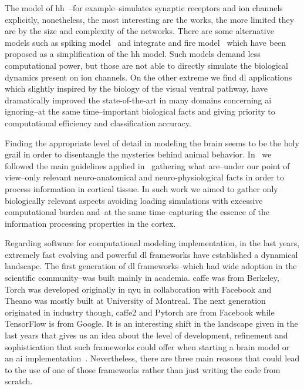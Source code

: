 \documentclass[10pt,journal,compsoc]{IEEEtran}
\begin{document}
The model of \gls{hh}~\cite{HODGKIN199025}--for example--simulates synaptic receptors and ion channels explicitly, nonetheless, the most interesting are the works, the more limited they are by the size and complexity of the networks. There are some alternative models such as spiking model~\cite{Izhikevich2004SpiketimingDO} and integrate and fire model~\cite{1333071} which have been proposed as a simplification of the \gls{hh} model. Such models demand less computational power, but those are not able to directly simulate the biological dynamics present on ion channels. On the other extreme we find \gls{dl} applications~\cite{lecun_deep_2015} which slightly inspired by the biology of the visual ventral pathway, have dramatically improved the state-of-the-art in many domains concerning \gls{ai} ignoring--at the same time--important biological facts and giving priority to computational efficiency and classification accuracy. 

Finding the appropriate level of detail in modeling the brain seems to be the holy grail in order to disentangle the mysteries behind animal behavior. In~\cite{Dematties2018} we followed the main guidelines applied in~\cite{10.3389/fncir.2016.00023} gathering what are--under our point of view--only relevant neuro-anatomical and neuro-physiological facts in order to process information in cortical tissue. In such work we aimed to gather only biologically relevant aspects avoiding loading simulations with excessive computational burden and--at the same time--capturing the essence of the information processing properties in the cortex.

Regarding software for computational modeling implementation, in the last years, extremely fast evolving and powerful \gls{dl} frameworks have established a dynamical landscape. The first generation of \gls{dl} frameworks--which had wide adoption in the scientific community--was built mainly in academia. \gls{caffe} was from Berkeley, Torch was developed originally in \gls{nyu} in collaboration with Facebook and Theano was mostly built at University of Montreal. The next generation originated in industry though, \gls{caffe}2 and Pytorch are from Facebook while TensorFlow is from Google. It is an interesting shift in the landscape given in the last years that gives us an idea about the level of development, refinement and sophistication that such frameworks could offer when starting a brain model or an \gls{ai} implementation~\cite{Bahrampour2015ComparativeSO,7979887}. Nevertheless, there are three main reasons that could lead to the use of one of those frameworks rather than just writing the code from scratch. 
\end{document}
